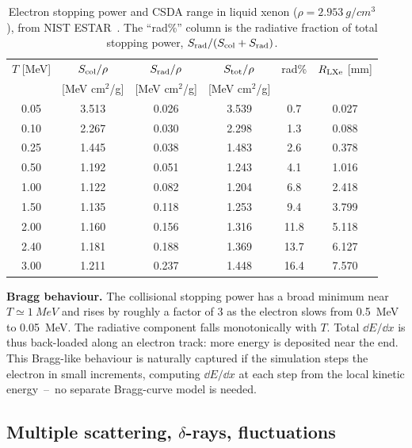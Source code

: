 \documentclass[11pt,a4paper]{article}
\begin{document}
\begin{table}[ht]
\centering
\caption{Electron stopping power and CSDA range in liquid xenon
($\rho=\SI{2.953}{g/cm^3}$), from NIST ESTAR~\cite{NIST-ESTAR}.
The ``rad\%'' column is the radiative fraction of total stopping
power, $S_{\rm rad}/(S_{\rm col}+S_{\rm rad})$.}
\label{tab:range}
\begin{tabular}{cccccc}
\toprule
$T$ [MeV] & $S_{\rm col}/\rho$ & $S_{\rm rad}/\rho$ &
$S_{\rm tot}/\rho$ & rad\% & $R_{\rm LXe}$ [mm] \\
          & [MeV cm$^2$/g]     & [MeV cm$^2$/g]     &
[MeV cm$^2$/g]     &       &                     \\
\midrule
0.05 & 3.513 & 0.026 & 3.539 & 0.7 & 0.027 \\
0.10 & 2.267 & 0.030 & 2.298 & 1.3 & 0.088 \\
0.25 & 1.445 & 0.038 & 1.483 & 2.6 & 0.378 \\
0.50 & 1.192 & 0.051 & 1.243 & 4.1 & 1.016 \\
1.00 & 1.122 & 0.082 & 1.204 & 6.8 & 2.418 \\
1.50 & 1.135 & 0.118 & 1.253 & 9.4 & 3.799 \\
2.00 & 1.160 & 0.156 & 1.316 & 11.8 & 5.118 \\
2.40 & 1.181 & 0.188 & 1.369 & 13.7 & 6.127 \\
3.00 & 1.211 & 0.237 & 1.448 & 16.4 & 7.570 \\
\bottomrule
\end{tabular}
\end{table}

\begin{remarkbox}
\textbf{Bragg behaviour.} The collisional stopping power has a
broad minimum near $T\!\simeq\!\SI{1}{MeV}$ and rises by roughly
a factor of $3$ as the electron slows from \SI{0.5}{MeV} to
\SI{0.05}{MeV}. The radiative component falls monotonically with
$T$. Total $\dd E/\dd x$ is thus back-loaded along an electron
track: more energy is deposited near the end. This Bragg-like
behaviour is naturally captured if the simulation steps the
electron in small increments, computing $\dd E/\dd x$ at each
step from the local kinetic energy~--~no separate Bragg-curve
model is needed.
\end{remarkbox}

\subsection{Multiple scattering, $\delta$-rays, fluctuations}
\label{sec:omitted-electron}
\end{document}
